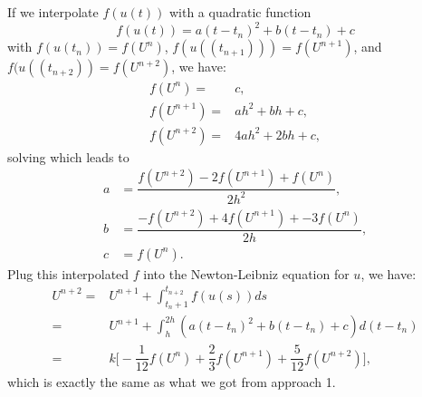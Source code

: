\documentclass[11pt]{article}
\begin{document}
\subsection{}
If we interpolate $f(u(t))$ with a quadratic function
\begin{equation}
    f(u(t)) = a(t-t_n)^2 + b(t-t_n) + c
\end{equation} 
with $f(u(t_n))=f(U^n)$, $f(u((t_{n+1}))) = f(U^{n+1})$, and 
$f(u((t_{n+2})) = f(U^{n+2})$, we have:
\begin{equation}\begin{split}
    f(U^n) =& c,\\
    f(U^{n+1}) =& ah^2 + bh + c,\\
    f(U^{n+2}) =& 4ah^2 + 2bh + c,
\end{split}\end{equation}
solving which leads to
\begin{equation}\begin{split}
    a &= \dfrac{f(U^{n+2}) - 2f(U^{n+1}) + f(U^n)}{2h^2},\\
    b &= \dfrac{-f(U^{n+2}) + 4f(U^{n+1}) + -3f(U^n)}{2h},\\
    c &= f(U^n).
\end{split}\end{equation} 
Plug this interpolated $f$ into the Newton-Leibniz equation for $u$, we have:
\begin{equation}\begin{split}
    U^{n+2}=&U^{n+1}+\int_{t_n+1}^{t_{n+2}}f(u(s))ds\\
           =&U^{n+1}+\int_h^{2h}(a(t-t_n)^2+b(t-t_n)+c)d(t-t_n)\\
           =&k\Big[-\dfrac1{12}f(U^{n}) + \dfrac23f(U^{n+1}) + \dfrac5{12}f(U^{n+2})\Big],
\end{split}\end{equation}
which is exactly the same as what we got from approach 1.

\pagebreak
\section{}

\pagebreak
\section{}

\pagebreak
\section{}
\end{document}
